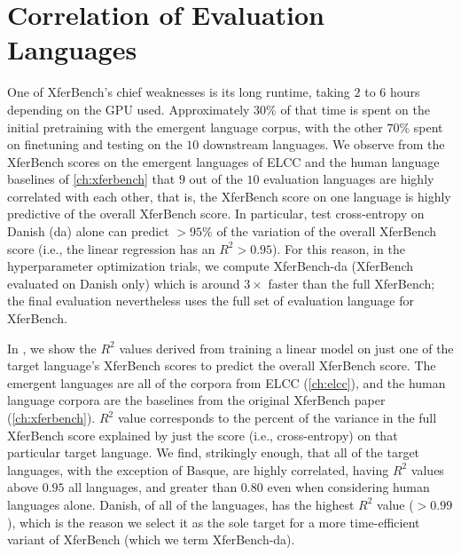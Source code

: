 \section{Correlation of Evaluation Languages}
\unskip\label{hpo:sec:eval-corr}

\begin{table}
  \centering
  \caption{$R^2$ values for individual target XferBench languages predicting the full XferBench score.  \emph{Human} and \emph{Emergent} refer to the $R^2$ value considering only the human or emergent languages, respectively.}
  \unskip\label{tab:target-corr}
\end{table}
One of XferBench's chief weaknesses is its long runtime, taking $2$ to $6$ hours depending on the GPU used.
Approximately $30\%$ of that time is spent on the initial pretraining with the emergent language corpus, with the other $70\%$ spent on finetuning and testing on the $10$ downstream languages.
We observe from the XferBench scores on the emergent languages of ELCC and the human language baselines of \cref{ch:xferbench} that $9$ out of the $10$ evaluation languages are highly correlated with each other, that is, the XferBench score on one language is highly predictive of the overall XferBench score.
In particular, test cross-entropy on Danish (da) alone can predict ${>}95\%$ of the variation of the overall XferBench score (i.e., the linear regression has an $R^2>0.95$).
For this reason, in the hyperparameter optimization trials, we compute XferBench-da (XferBench evaluated on Danish only) which is around $3{\times}$ faster than the full XferBench; the final evaluation nevertheless uses the full set of evaluation language for XferBench.

In , we show the $R^2$ values derived from training a linear model on just one of the target language's XferBench scores to predict the overall XferBench score.
The emergent languages are all of the corpora from ELCC (\cref{ch:elcc}), and the human language corpora are the baselines from the original XferBench paper (\cref{ch:xferbench}).
$R^2$ value corresponds to the percent of the variance in the full XferBench score explained by just the score (i.e., cross-entropy) on that particular target language.
We find, strikingly enough, that all of the target languages, with the exception of Basque, are highly correlated, having $R^2$ values above $0.95$ all languages, and greater than $0.80$ even when considering human languages alone.
Danish, of all of the languages, has the highest $R^2$ value (${>}0.99$), which is the reason we select it as the sole target for a more time-efficient variant of XferBench (which we term XferBench-da).


